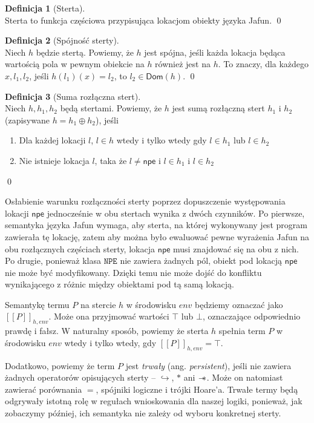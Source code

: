 \documentclass[]{pracamgr}
\newcommand \wand {\mathrel{-\mkern-6mu*}}
\renewcommand \| {\hspace{0.75em} | \hspace{0.75em} }
\renewcommand \[ {[\![}
\renewcommand \] {]\!]}
\theoremstyle{definition}
\newtheorem{definition}{Definicja}[section]
\newcommand{\dom}[1]{\mathsf{Dom}(#1)\xspace}
\newcommand{\npetype}{\texttt{NPE}\xspace}
\newcommand{\npe}{\mathsf{npe}\xspace}
\begin{document}
\begin{definition}[Sterta]{\ } \\
 Sterta to funkcja częściowa przypisująca lokacjom obiekty języka Jafun.
 \qed
\end{definition}

\begin{definition}[Spójność sterty]{\ } \\
Niech $h$ będzie stertą.
Powiemy, że $h$ jest spójna, jeśli każda lokacja będąca wartością pola w pewnym obiekcie na $h$
również jest na $h$.
To znaczy, dla każdego $x, l_1, l_2$, jeśli $h(l_1)(x) = l_2$, to $l_2 \in \dom{h}$.
\qed
\end{definition}

\begin{definition}[Suma rozłączna stert]{\ } \\
Niech $h, h_1, h_2$ będą stertami.
Powiemy, że $h$ jest sumą rozłączną stert $h_1$ i $h_2$ (zapisywane $h = h_1 \oplus h_2$),
jeśli
\begin{enumerate}
 \item Dla każdej lokacji $l$, $l \in h$ wtedy i tylko wtedy gdy $l \in h_1$ lub $l \in h_2$
 \item Nie istnieje lokacja $l$, taka że $l \neq \npe$ i $l \in h_1$ i $l \in h_2$
\end{enumerate}
\qed

Osłabienie warunku rozłączności sterty poprzez dopuszczenie występowania lokacji $\npe$
jednocześnie w obu stertach wynika z dwóch czynników.
Po pierwsze, semantyka języka Jafun wymaga, aby sterta, na której wykonywany jest program zawierała
tę lokację, zatem aby można było ewaluować pewne wyrażenia Jafun na obu rozłącznych częściach
sterty, lokacja $\npe$ musi znajdować się na obu z nich.
Po drugie, ponieważ klasa $\npetype$ nie zawiera żadnych pól, obiekt pod lokacją $\npe$ nie może
być modyfikowany. Dzięki temu nie może dojść do konfliktu wynikającego z różnic między obiektami
pod tą samą lokacją.
\end{definition}

Semantykę termu $P$ na stercie $h$ w środowisku $env$ będziemy oznaczać jako
$\[ P \]_{h, env}$. Może ona przyjmować wartości $\top$ lub $\bot$, oznaczające odpowiednio
prawdę i fałsz. W naturalny sposób, powiemy że sterta $h$ spełnia term $P$ w środowisku $env$
wtedy i tylko wtedy, gdy $\[ P \]_{h, env} = \top$.

Dodatkowo, powiemy że term $P$ jest \textit{trwały} (ang. \textit{persistent}),
jeśli nie zawiera żadnych operatorów opisujących sterty -- $\hookrightarrow$, $*$ ani $\wand$.
Może on natomiast zawierać porównania $=$, spójniki logiczne i trójki Hoare'a.
Trwałe termy będą odgrywały istotną rolę w regułach wnioskowania dla naszej logiki,
ponieważ, jak zobaczymy później, ich semantyka nie zależy od wyboru konkretnej sterty.
\end{document}
